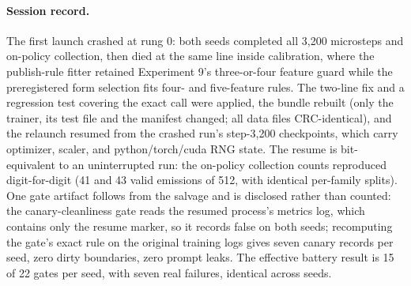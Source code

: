 \documentclass[10pt,a4paper]{article}
\begin{document}
\paragraph{Session record.}
The first launch crashed at rung 0: both seeds completed all 3{,}200
microsteps and on-policy collection, then died at the same line inside
calibration, where the publish-rule fitter retained Experiment 9's three-or-four
feature guard while the preregistered form selection fits four- and
five-feature rules. The two-line fix and a regression test covering the
exact call were applied, the bundle rebuilt (only the trainer, its test file
and the manifest changed; all data files CRC-identical), and the relaunch
resumed from the crashed run's step-3{,}200 checkpoints, which carry
optimizer, scaler, and python/torch/cuda RNG state. The resume is
bit-equivalent to an uninterrupted run: the on-policy collection counts
reproduced digit-for-digit (41 and 43 valid emissions of 512, with identical
per-family splits). One gate artifact follows from the salvage and is
disclosed rather than counted: the canary-cleanliness gate reads the
resumed process's metrics log, which contains only the resume marker, so it
records false on both seeds; recomputing the gate's exact rule on the
original training logs gives seven canary records per seed, zero dirty
boundaries, zero prompt leaks. The effective battery result is 15 of 22
gates per seed, with seven real failures, identical across seeds.
\end{document}
